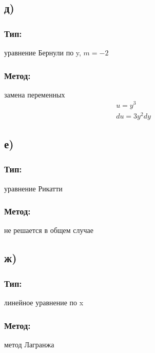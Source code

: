\documentclass{article}
\begin{document}
\subsection*{д)}
\subsubsection*{Тип:} 
уравнение Бернули по y, $m=-2$

\subsubsection*{Метод:}
замена переменных
\begin{gather*}
    u=y^3\\
    du=3y^2dy
\end{gather*}

\subsection*{е)}
\subsubsection*{Тип:} 
уравнение Рикатти

\subsubsection*{Метод:}
не решается в общем случае

\subsection*{ж)}
\subsubsection*{Тип:} 
линейное уравнение по x

\subsubsection*{Метод:}
метод Лагранжа
\end{document}
